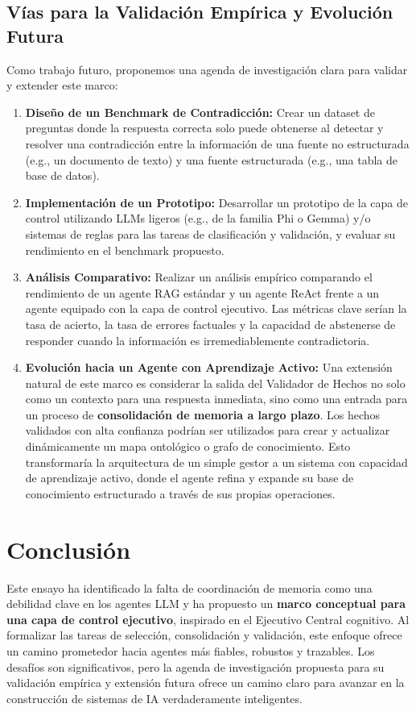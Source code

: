 \documentclass[conference]{IEEEtran}
\begin{document}
\subsection{Vías para la Validación Empírica y Evolución Futura}
Como trabajo futuro, proponemos una agenda de investigación clara para validar y extender este marco:
\begin{enumerate}
    \item \textbf{Diseño de un Benchmark de Contradicción:} Crear un dataset de preguntas donde la respuesta correcta solo puede obtenerse al detectar y resolver una contradicción entre la información de una fuente no estructurada (e.g., un documento de texto) y una fuente estructurada (e.g., una tabla de base de datos).
    \item \textbf{Implementación de un Prototipo:} Desarrollar un prototipo de la capa de control utilizando LLMs ligeros (e.g., de la familia Phi o Gemma) y/o sistemas de reglas para las tareas de clasificación y validación, y evaluar su rendimiento en el benchmark propuesto.
    \item \textbf{Análisis Comparativo:} Realizar un análisis empírico comparando el rendimiento de un agente RAG estándar y un agente ReAct frente a un agente equipado con la capa de control ejecutivo. Las métricas clave serían la tasa de acierto, la tasa de errores factuales y la capacidad de abstenerse de responder cuando la información es irremediablemente contradictoria.
    \item \textbf{Evolución hacia un Agente con Aprendizaje Activo:} Una extensión natural de este marco es considerar la salida del Validador de Hechos no solo como un contexto para una respuesta inmediata, sino como una entrada para un proceso de \textbf{consolidación de memoria a largo plazo}. Los hechos validados con alta confianza podrían ser utilizados para crear y actualizar dinámicamente un mapa ontológico o grafo de conocimiento. Esto transformaría la arquitectura de un simple gestor a un sistema con capacidad de aprendizaje activo, donde el agente refina y expande su base de conocimiento estructurado a través de sus propias operaciones.
\end{enumerate}

\section{Conclusión}
Este ensayo ha identificado la falta de coordinación de memoria como una debilidad clave en los agentes LLM y ha propuesto un \textbf{marco conceptual para una capa de control ejecutivo}, inspirado en el Ejecutivo Central cognitivo. Al formalizar las tareas de selección, consolidación y validación, este enfoque ofrece un camino prometedor hacia agentes más fiables, robustos y trazables. Los desafíos son significativos, pero la agenda de investigación propuesta para su validación empírica y extensión futura ofrece un camino claro para avanzar en la construcción de sistemas de IA verdaderamente inteligentes.
\end{document}
